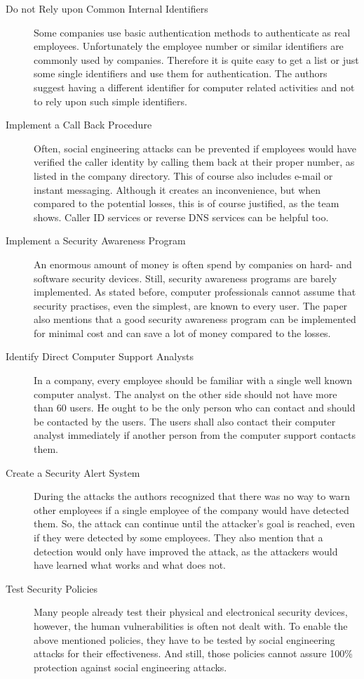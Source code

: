 \begin{description}
  \item[Do not Rely upon Common Internal Identifiers] Some companies use basic
  authentication methods to authenticate as real employees. Unfortunately the
  employee number or similar identifiers are commonly used by companies.
  Therefore it is quite easy to get a list or just some single identifiers and
  use them for authentication. The authors suggest having a different
  identifier for computer related activities and not to rely upon such simple
  identifiers.
  \item[Implement a Call Back Procedure] Often, social engineering attacks can
  be prevented if employees would have verified the caller identity by calling
  them back at their proper number, as listed in the company directory. This of
  course also includes e-mail or instant messaging. Although it creates an
  inconvenience, but when compared to the potential losses, this is of course
  justified, as the team shows. Caller ID services or reverse DNS services can
  be helpful too.
  \item[Implement a Security Awareness Program] An enormous amount of money is
  often spend by companies on hard- and software security devices. Still, security
  awareness programs are barely implemented. As stated before, computer
  professionals cannot assume that security practises, even the simplest, are
  known to every user. The paper also mentions that a good security awareness
  program can be implemented for minimal cost and can save a lot of money
  compared to the losses.
  \item[Identify Direct Computer Support Analysts] In a company, every employee
  should be familiar with a single well known computer analyst. The analyst on
  the other side should not have more than 60 users. He ought to be the only
  person who can contact and should be contacted by the users. The users
  shall also contact their computer analyst immediately if another person
  from the computer support contacts them.
  \item[Create a Security Alert System] During the attacks the authors 
  recognized that there was no way to warn other employees if a single
  employee of the company would have detected them. So, the attack can
  continue until the attacker's goal is reached, even if they were detected by some
  employees. They also mention that a detection would only have improved the
  attack, as the attackers would have learned what works and what does
  not.
  \item[Test Security Policies] Many people already test their physical
  and electronical security devices, however, the human vulnerabilities is often not
  dealt with. To enable the above mentioned policies, they have to be tested
  by social engineering attacks for their effectiveness. And still, those
  policies cannot assure 100\% protection against social engineering attacks.
\end{description}


